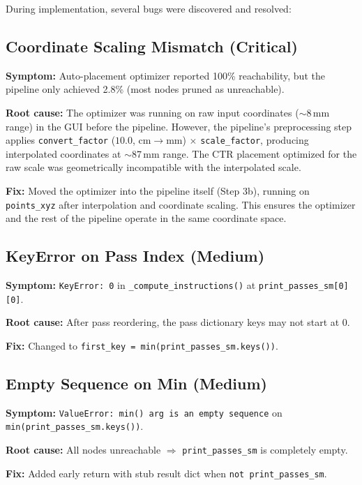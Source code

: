 \documentclass[11pt,a4paper]{article}
\newcommand{\funcname}[1]{\texttt{\textcolor{codepurple}{#1}}}
\begin{document}
During implementation, several bugs were discovered and resolved:

\subsection{Coordinate Scaling Mismatch (Critical)}

\textbf{Symptom:} Auto-placement optimizer reported 100\% reachability, but the pipeline only achieved 2.8\% (most nodes pruned as unreachable).

\textbf{Root cause:} The optimizer was running on raw input coordinates ($\sim$8\,mm range) in the GUI before the pipeline. However, the pipeline's preprocessing step applies \texttt{convert\_factor} ($10.0$, cm$\to$mm) $\times$ \texttt{scale\_factor}, producing interpolated coordinates at $\sim$87\,mm range. The CTR placement optimized for the raw scale was geometrically incompatible with the interpolated scale.

\textbf{Fix:} Moved the optimizer into the pipeline itself (Step 3b), running on \texttt{points\_xyz} after interpolation and coordinate scaling. This ensures the optimizer and the rest of the pipeline operate in the same coordinate space.

\subsection{KeyError on Pass Index (Medium)}

\textbf{Symptom:} \texttt{KeyError: 0} in \funcname{\_compute\_instructions()} at \texttt{print\_passes\_sm[0][0]}.

\textbf{Root cause:} After pass reordering, the pass dictionary keys may not start at 0.

\textbf{Fix:} Changed to \texttt{first\_key = min(print\_passes\_sm.keys())}.

\subsection{Empty Sequence on Min (Medium)}

\textbf{Symptom:} \texttt{ValueError: min() arg is an empty sequence} on \texttt{min(print\_passes\_sm.keys())}.

\textbf{Root cause:} All nodes unreachable $\Rightarrow$ \texttt{print\_passes\_sm} is completely empty.

\textbf{Fix:} Added early return with stub result dict when \texttt{not print\_passes\_sm}.
\end{document}
